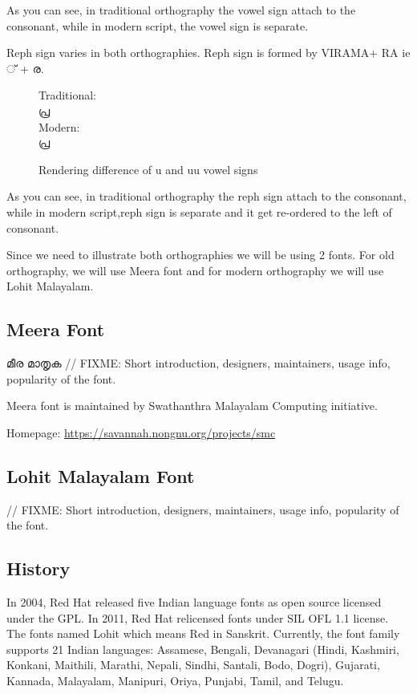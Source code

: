 As you can see, in traditional orthography the vowel sign attach to the 
consonant, while in modern script, the vowel sign is separate.

Reph sign varies in both orthographies. Reph sign is formed by VIRAMA+ RA ie 
{\malayalam ് + ര}.
\begin{figure}[h]
Traditional:\\ {\meera\textexample  പ്ര }\\
Modern: \\ {\lohitmalayalam\textexample  പ്ര }
   \caption{Rendering difference of u and uu vowel signs}
\end{figure}

As you can see, in traditional orthography the reph sign attach to the 
consonant, while in modern script,reph sign is separate and it get re-ordered 
to the left of consonant.



Since we need to illustrate both orthographies we will be using 2
fonts. For old orthography, we will use Meera font and for modern
orthography we will use Lohit Malayalam.

\subsection {Meera Font}
{\meera മീര മാതൃക }
// FIXME: Short introduction, designers, maintainers, usage info, popularity of 
the font.

Meera font is maintained by Swathanthra Malayalam Computing initiative.

Homepage: {\url{https://savannah.nongnu.org/projects/smc}}

\subsection {Lohit Malayalam Font}
// FIXME: Short introduction, designers, maintainers, usage info, popularity of 
the font.

\subsection {History}
In 2004, Red Hat released five Indian language fonts as open source licensed
under the GPL. In 2011, Red Hat relicensed fonts under SIL OFL 1.1 license.
The fonts named Lohit which means Red in Sanskrit. Currently, the font family
supports 21 Indian languages: Assamese, Bengali, Devanagari (Hindi, Kashmiri,
Konkani, Maithili, Marathi, Nepali, Sindhi, Santali, Bodo, Dogri), Gujarati,
Kannada, Malayalam, Manipuri, Oriya, Punjabi, Tamil, and Telugu.

